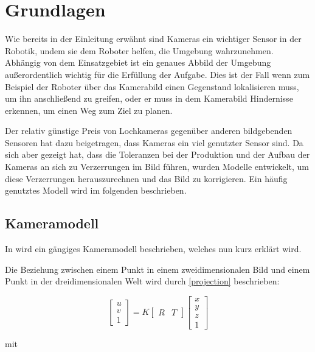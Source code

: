 \chapter{Grundlagen}
\label{chap:grundlagen}

Wie bereits in der Einleitung erwähnt sind Kameras ein wichtiger Sensor in der Robotik, undem sie dem Roboter helfen, die Umgebung wahrzunehmen. Abhängig von dem Einsatzgebiet ist ein genaues Abbild der Umgebung außerordentlich wichtig für die Erfüllung der Aufgabe. Dies ist der Fall wenn zum Beispiel der Roboter über das Kamerabild einen Gegenstand lokalisieren muss, um ihn anschließend zu greifen, oder er muss in dem Kamerabild Hindernisse erkennen, um einen Weg zum Ziel zu planen.

Der relativ günstige Preis von Lochkameras gegenüber anderen bildgebenden Sensoren hat dazu beigetragen, dass Kameras ein viel genutzter Sensor sind. Da sich aber gezeigt hat, dass die Toleranzen bei der Produktion und der Aufbau der Kameras an sich zu Verzerrungen im Bild führen, wurden Modelle entwickelt, um diese Verzerrungen herauszurechnen und das Bild zu korrigieren. Ein häufig genutztes Modell wird im folgenden beschrieben.

\section{Kameramodell} %
\label{sec:kameramodell}
In \cite{Zhang} wird ein gängiges Kameramodell beschrieben, welches nun kurz erklärt wird.

Die Beziehung zwischen einem Punkt in einem zweidimensionalen Bild und einem Punkt in der dreidimensionalen Welt wird durch \autoref{projection} beschrieben:

\begin{equation}
\begin{bmatrix}
 	u \\
 	v \\
 	1
\end{bmatrix} = K 
\begin{bmatrix}
   	R & T
\end{bmatrix} 
\begin{bmatrix}
   	x \\
   	y \\
   	z \\
   	1
\end{bmatrix} \label{projection}
\end{equation}

mit 

